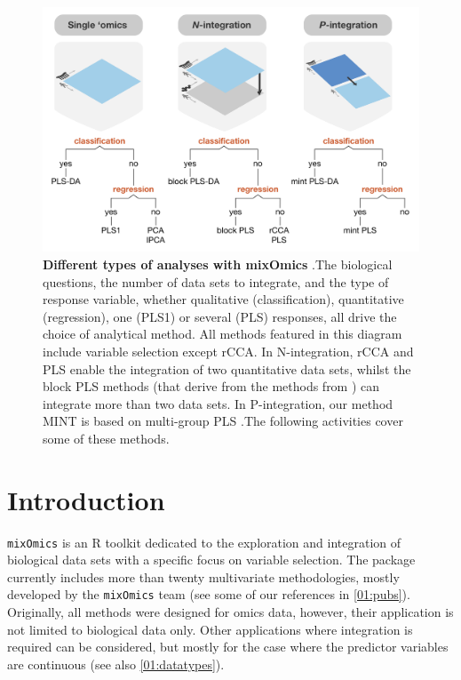 \documentclass[
]{book}
\begin{document}
\begin{figure}
\centering
\includegraphics{InputFigures/MixOmicsAnalysesV2.png}
\caption{\label{fig:00-analyses-diagram}\textbf{Different types of analyses with mixOmics} \citep{mixomics}.The biological questions, the number of data sets to integrate, and the type of response variable, whether qualitative (classification), quantitative (regression), one (PLS1) or several (PLS) responses, all drive the choice of analytical method. All methods featured in this diagram include variable selection except rCCA. In N-integration, rCCA and PLS enable the integration of two quantitative data sets, whilst the block PLS methods (that derive from the methods from \citet{Ten11}) can integrate more than two data sets. In P-integration, our method MINT is based on multi-group PLS \citep{Esl14b}.The following activities cover some of these methods.}
\end{figure}

\hypertarget{01}{%
\chapter{Introduction}\label{01}}

\texttt{mixOmics} is an R toolkit dedicated to the exploration and integration of biological data sets with a specific focus on variable selection. The package currently includes more than twenty multivariate methodologies, mostly developed by the \texttt{mixOmics} team (see some of our references in \ref{01:pubs}). Originally, all methods were designed for omics data, however, their application is not limited to biological data only. Other applications where integration is required can be considered, but mostly for the case where the predictor variables are continuous (see also \ref{01:datatypes}).
\end{document}
